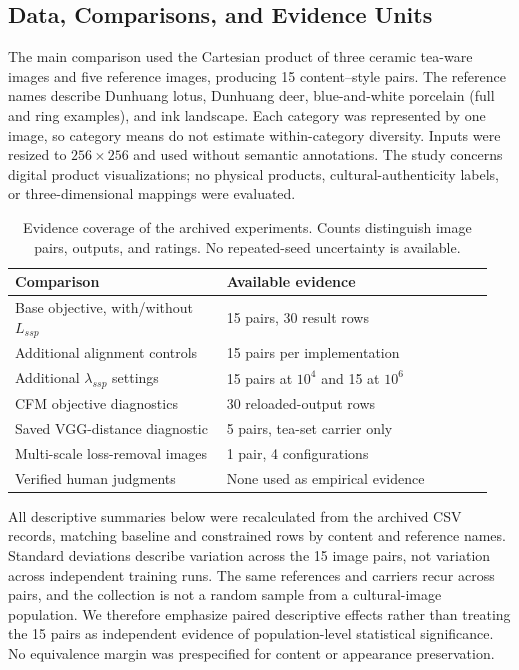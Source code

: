\documentclass[manuscript,acmlarge,screen,review]{acmart}
\begin{document}
\subsection{Data, Comparisons, and Evidence Units}
The main comparison used the Cartesian product of three ceramic tea-ware images and five reference images, producing 15 content--style pairs. The reference names describe Dunhuang lotus, Dunhuang deer, blue-and-white porcelain (full and ring examples), and ink landscape. Each category was represented by one image, so category means do not estimate within-category diversity. Inputs were resized to $256\times256$ and used without semantic annotations. The study concerns digital product visualizations; no physical products, cultural-authenticity labels, or three-dimensional mappings were evaluated.

\begin{table}[t]
\centering
\caption{Evidence coverage of the archived experiments. Counts distinguish image pairs, outputs, and ratings. No repeated-seed uncertainty is available.}
\label{tab:coverage}
\begin{tabular}{@{}p{0.42\linewidth}p{0.53\linewidth}@{}}
\toprule
Comparison & Available evidence \\
\midrule
Base objective, with/without $L_{ssp}$ & 15 pairs, 30 result rows \\
Additional alignment controls & 15 pairs per implementation \\
Additional $\lambda_{ssp}$ settings & 15 pairs at $10^4$ and 15 at $10^6$ \\
CFM objective diagnostics & 30 reloaded-output rows \\
Saved VGG-distance diagnostic & 5 pairs, tea-set carrier only \\
Multi-scale loss-removal images & 1 pair, 4 configurations \\
Verified human judgments & None used as empirical evidence \\
\bottomrule
\end{tabular}
\end{table}

All descriptive summaries below were recalculated from the archived CSV records, matching baseline and constrained rows by content and reference names. Standard deviations describe variation across the 15 image pairs, not variation across independent training runs. The same references and carriers recur across pairs, and the collection is not a random sample from a cultural-image population. We therefore emphasize paired descriptive effects rather than treating the 15 pairs as independent evidence of population-level statistical significance. No equivalence margin was prespecified for content or appearance preservation.
\end{document}
